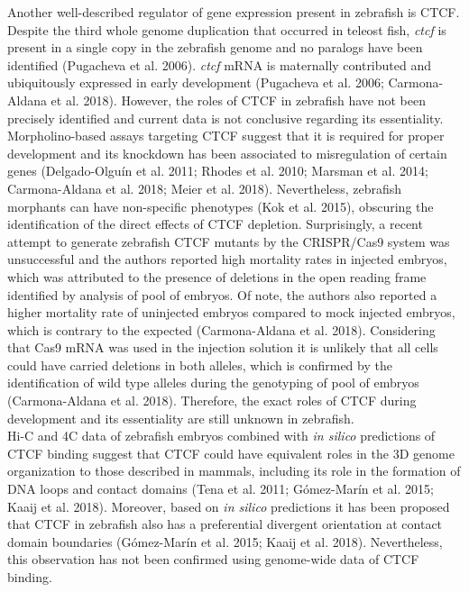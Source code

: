 Another well-described regulator of gene expression present in zebrafish is CTCF. Despite the third whole genome duplication that occurred in teleost fish, \textit{ctcf} is present in a single copy in the zebrafish genome and no paralogs have been identified (Pugacheva et al. 2006). \textit{ctcf} mRNA is maternally contributed and ubiquitously expressed in early development (Pugacheva et al. 2006; Carmona-Aldana et al. 2018). However, the roles of CTCF in zebrafish have not been precisely identified and current data is not conclusive regarding its essentiality. Morpholino-based assays targeting CTCF suggest that it is required for proper development and its knockdown has been associated to misregulation of certain genes (Delgado-Olguín et al. 2011; Rhodes et al. 2010; Marsman et al. 2014; Carmona-Aldana et al. 2018; Meier et al. 2018). Nevertheless, zebrafish morphants can have non-specific phenotypes (Kok et al. 2015), obscuring the identification of the direct effects of CTCF depletion. Surprisingly, a recent attempt to generate zebrafish CTCF mutants by the CRISPR/Cas9 system was unsuccessful and the authors reported high mortality rates in injected embryos, which was attributed to the presence of deletions in the open reading frame identified by analysis of pool of embryos. Of note, the authors also reported a higher mortality rate of uninjected embryos compared to mock injected embryos, which is contrary to the expected (Carmona-Aldana et al. 2018). Considering that Cas9 mRNA was used in the injection solution it is unlikely that all cells could have carried deletions in both alleles, which is confirmed by the identification of wild type alleles during the genotyping of pool of embryos (Carmona-Aldana et al. 2018). Therefore, the exact roles of CTCF during development and its essentiality are still unknown in zebrafish.\\

Hi-C and 4C data of zebrafish embryos combined with \textit{in silico} predictions of CTCF binding suggest that CTCF could have equivalent roles in the 3D genome organization to those described in mammals, including its role in the formation of DNA loops and contact domains (Tena et al. 2011; Gómez-Marín et al. 2015; Kaaij et al. 2018). Moreover, based on \textit{in silico} predictions it has been proposed that CTCF in zebrafish also has a preferential divergent orientation at contact domain boundaries (Gómez-Marín et al. 2015; Kaaij et al. 2018). Nevertheless, this observation has not been confirmed using genome-wide data of CTCF binding.\\

